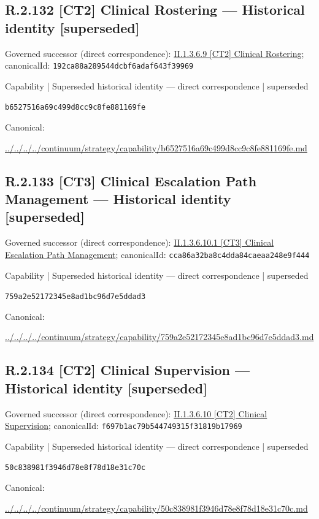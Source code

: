 \documentclass[10pt,a4paper]{article}
\begin{document}
\subsection*{R.2.132 [CT2] Clinical Rostering — Historical identity [superseded]}
Governed successor (direct correspondence): \hyperref[element-192ca88a289544dcbf6adaf643f39969]{II.1.3.6.9 [CT2] Clinical Rostering}; canonicalId: \texttt{192ca88a289544dcbf6adaf643f39969}\par
\label{element-b6527516a69c499d8cc9c8fe881169fe}
{\small Capability | Superseded historical identity — direct correspondence | superseded}\par
\texttt{b6527516a69c499d8cc9c8fe881169fe}\par
Canonical: \par
{\footnotesize\url{../../../../continuum/strategy/capability/b6527516a69c499d8cc9c8fe881169fe.md}}\par
\subsection*{R.2.133 [CT3] Clinical Escalation Path Management — Historical identity [superseded]}
Governed successor (direct correspondence): \hyperref[element-cca86a32ba8c4dda84caeaa248e9f444]{II.1.3.6.10.1 [CT3] Clinical Escalation Path Management}; canonicalId: \texttt{cca86a32ba8c4dda84caeaa248e9f444}\par
\label{element-759a2e52172345e8ad1bc96d7e5ddad3}
{\small Capability | Superseded historical identity — direct correspondence | superseded}\par
\texttt{759a2e52172345e8ad1bc96d7e5ddad3}\par
Canonical: \par
{\footnotesize\url{../../../../continuum/strategy/capability/759a2e52172345e8ad1bc96d7e5ddad3.md}}\par
\subsection*{R.2.134 [CT2] Clinical Supervision — Historical identity [superseded]}
Governed successor (direct correspondence): \hyperref[element-f697b1ac79b544749315f31819b17969]{II.1.3.6.10 [CT2] Clinical Supervision}; canonicalId: \texttt{f697b1ac79b544749315f31819b17969}\par
\label{element-50c838981f3946d78e8f78d18e31c70c}
{\small Capability | Superseded historical identity — direct correspondence | superseded}\par
\texttt{50c838981f3946d78e8f78d18e31c70c}\par
Canonical: \par
{\footnotesize\url{../../../../continuum/strategy/capability/50c838981f3946d78e8f78d18e31c70c.md}}\par
\end{document}
